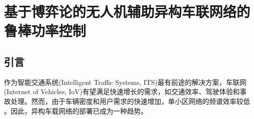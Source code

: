 \chapter{基于博弈论的无人机辅助异构车联网络的鲁棒功率控制}

\section{引言}\label{section2-1}
作为智能交通系统(Intelligent Traffic Systems, ITS)最有前途的解决方案，车联网(Internet of Vehicles, IoV)有望满足快速增长的需求，如交通效率、驾驶体验和事故处理。然而，由于车辆密度和用户需求的快速增加，单小区网络的频谱效率较低 \supercite{TFL}。因此，异构车载网络的部署已成为一种趋势。

